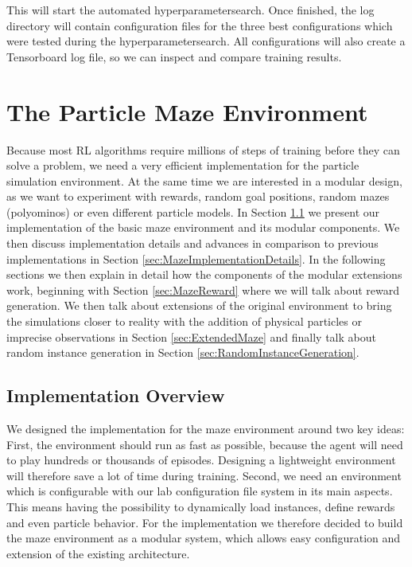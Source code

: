 \noindent This will start the automated hyperparametersearch. Once finished, the log directory will contain configuration files for the three best configurations which were tested during the hyperparametersearch. All configurations will also create a Tensorboard log file, so we can inspect and compare training results.


\section{The Particle Maze Environment} \label{sec:MazeEnvironment}
Because most RL algorithms require millions of steps of training before they can solve a problem, we need a very efficient implementation for the particle simulation environment. At the same time we are interested in a modular design, as we want to experiment with rewards, random goal positions, random mazes (polyominos) or even different particle models. In Section \ref{sec:MazeImplementation} we present our implementation of the basic maze environment and its modular components. We then discuss implementation details and advances in comparison to previous implementations in Section \ref{sec:MazeImplementationDetails}. In the following sections we then explain in detail how the components of the modular extensions work, beginning with Section \ref{sec:MazeReward} where we will talk about reward generation. We then talk about extensions of the original environment to bring the simulations closer to reality with the addition of physical particles or imprecise observations in Section \ref{sec:ExtendedMaze} and finally talk about random instance generation in Section \ref{sec:RandomInstanceGeneration}.

\subsection{Implementation Overview} \label{sec:MazeImplementation}
We designed the implementation for the maze environment around two key ideas: First, the environment should run as fast as possible, because the agent will need to play hundreds or thousands of episodes. Designing a lightweight environment will therefore save a lot of time during training. Second, we need an environment which is configurable with our lab configuration file system in its main aspects. This means having the possibility to dynamically load instances, define rewards and even particle behavior. For the implementation we therefore decided to build the maze environment as a modular system, which allows easy configuration and extension of the existing architecture. 

